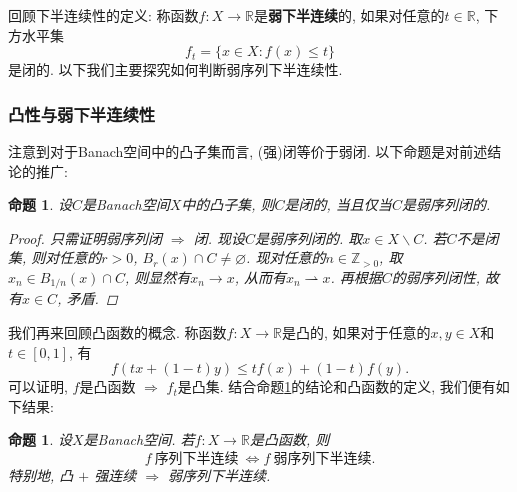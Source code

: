\documentclass[12pt,a4paper]{article}
\newtheorem{proposition}[theorem]{命题}
\begin{document}
回顾下半连续性的定义: 称函数$f\colon X \rightarrow \mathbb{R}$是\textbf{弱下半连续}的, 如果对任意的$t \in \mathbb{R}$, 下方水平集
\begin{equation*}
    f_t = \{x \in X\colon f(x) \leq t\}
\end{equation*}
是闭的. 以下我们主要探究如何判断弱序列下半连续性.

\subsubsection{凸性与弱下半连续性}

注意到对于Banach空间中的凸子集而言, (强)闭等价于弱闭. 以下命题是对前述结论的推广:

\begin{proposition}\label{prop2.28}
    设$C$是Banach空间$X$中的凸子集, 则$C$是闭的, 当且仅当$C$是弱序列闭的.
    \begin{proof}
        只需证明弱序列闭 $\Rightarrow$ 闭. 现设$C$是弱序列闭的. 取$x \in X \smallsetminus C$.
        若$C$不是闭集, 则对任意的$r > 0$, $B_r(x) \cap C \neq \varnothing$. 
        现对任意的$n \in \mathbb{Z}_{>0}$, 取$x_n \in B_{1/n}(x) \cap C$, 则显然有$x_n \rightarrow x$, 从而有$x_n \rightharpoonup x$.
        再根据$C$的弱序列闭性, 故有$x \in C$, 矛盾. 
    \end{proof}
\end{proposition}

我们再来回顾凸函数的概念. 称函数$f\colon X \rightarrow \mathbb{R}$是凸的, 如果对于任意的$x, y \in X$和$t \in [0, 1]$, 有 
\begin{equation*}
    f(tx + (1 - t)y) \leq tf(x) + (1 - t)f(y).
\end{equation*}
可以证明, $f$是凸函数 $\Rightarrow$ $f_t$是凸集. 结合命题\ref{prop2.28}的结论和凸函数的定义, 我们便有如下结果:

\begin{proposition}
    设$X$是Banach空间. 若$f\colon X \rightarrow \mathbb{R}$是凸函数, 则 
    \begin{equation*}
        f\ \text{序列下半连续}\ \Longleftrightarrow f\ \text{弱序列下半连续}.
    \end{equation*}
    特别地, 凸 $+$ 强连续 $\Rightarrow$ 弱序列下半连续.
\end{proposition}
\end{document}
